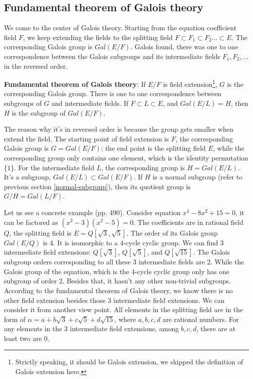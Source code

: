\documentclass[b5paper]{article}
\begin{document}
\subsection{Fundamental theorem of Galois theory}

We come to the center of Galois theory. Starting from the equation coefficient field $F$, we keep extending the fields to the splitting field $F \subset F_1 \subset F_2 ... \subset E$. The corresponding Galois group is $Gal(E/F)$. Galois found, there was one to one correspondence between the Galois subgroups and its intermediate fields $F_1, F_2, ...$ in the reversed order.

\begin{theorem}
\textbf{Fundamental theorem of Galois theory}: If $E/F$ is field extension\footnote{Strictly speaking, it should be Galois extension, we skipped the definition of Galois extension here.}, $G$ is the corresponding Galois group. There is one to one correspondence between subgroups of $G$ and intermediate fields. If $F \subset L \subset E$, and $Gal(E/L) = H$, then $H$ is the subgroup of $Gal(E/F)$.
\end{theorem}

The reason why it's in reversed order is because the group gets smaller when extend the field. The starting point of field extension is $F$, the corresponding Galois group is $G = Gal(E/F)$; the end point is the splitting field $E$, while the corresponding group only contains one element, which is the identity permutation $\{1\}$. For the intermediate field $L$, the corresponding group is $H = Gal(E/L)$. It's a subgroup, $Gal(E/L) \subset Gal(E/F)$. If $H$ is a normal subgroup (refer to previous section \ref{normal-subgroup}), then its quotient group is $G/H = Gal(L/F)$.

Let us see a concrete example\cite{MArtin} (pp. 490). Consider equation $x^4 - 8x^2 + 15 = 0$, it can be factored as $(x^2 - 3)(x^2 - 5) = 0$. The coefficients are in rational field $Q$, the splitting field is $E = Q[\sqrt{3}, \sqrt{5}]$. The order of its Galois group $Gal(E/Q)$ is 4. It is isomorphic to a 4-cycle cyclic group. We can find 3 intermediate field extensions: $Q[\sqrt{3}]$, $Q[\sqrt{5}]$, and $Q[\sqrt{15}]$. The Galois subgroup orders corresponding to all these 3 intermediate fields are 2. While the Galois group of the equation, which is the 4-cycle cyclic group only has one subgroup of order 2. Besides that, it hasn't any other non-trivial subgroups. According to the fundamental theorem of Galois theory, we know there is no other field extension besides those 3 intermediate field extensions. We can consider it from another view point. All elements in the splitting field are in the form of $\alpha = a + b\sqrt{3} + c\sqrt{5} + d\sqrt{15}$, where $a, b, c, d$ are rational numbers. For any elements in the 3 intermediate field extensions, among $b, c, d$, there are at least two are 0.
\end{document}
